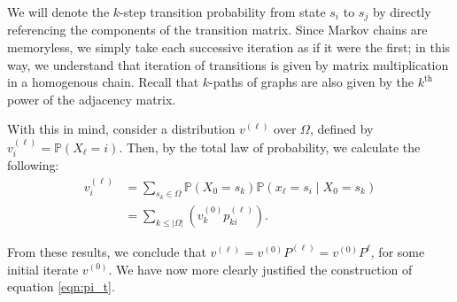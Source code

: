 \documentclass[11pt,letterpaper]{amsart}
\newcommand{\iterate}[2]{#1^{(#2)}}
\newcommand{\parens}[1]{ \left( #1 \right) }
\newcommand{\prob}{\mathbb{P}}
\begin{document}
We will denote the $k$-step transition probability from state $s_i$ to $s_j$ by
directly referencing the components of the transition matrix. Since Markov
chains are memoryless, we simply take each successive iteration as if it were
the first; in this way, we understand that iteration of transitions is given by
matrix multiplication in a homogenous chain. Recall that $k$-paths of graphs are
also given by the $k^\text{th}$ power of the adjacency matrix.

With this in mind, consider a distribution $\iterate{v}{\ell}$ over $\Omega$,
defined by $\iterate{v}{\ell}_i = \prob(X_\ell = i)$. Then, by the total law of
probability, we calculate the following:
\begin{align*}
  \iterate{v}{\ell}_i &= \sum_{s_k\in\Omega}{\prob(X_0 = s_k) \prob(x_\ell = s_i \mid X_0 = s_k)} \\
                      &= \sum_{k\leq |\Omega|}{\parens{\iterate{v}{0}_k \iterate{p}{\ell}_{ki}}}.
\end{align*}

From these results, we conclude that
$\iterate{v}{\ell} = \iterate{v}{0} \iterate{P}{\ell} = \iterate{v}{0} P^\ell$,
for some initial iterate $\iterate{v}{0}$. We have now more clearly justified
the construction of equation \eqref{eqn:pi_t}.
\end{document}
